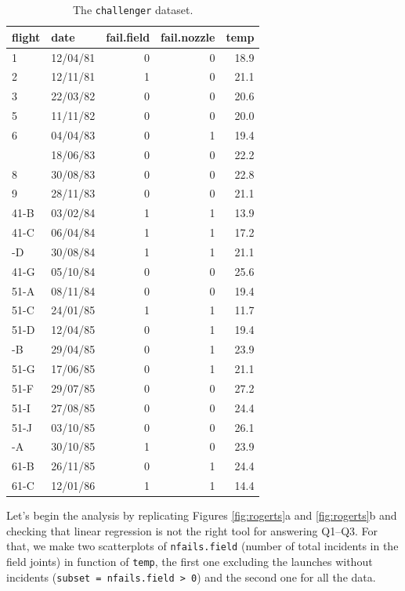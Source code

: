 \documentclass[]{book}
\theoremstyle{definition}
\theoremstyle{definition}
\theoremstyle{definition}
\theoremstyle{remark}
\begin{document}
\begin{longtable}[t]{llrrr}
\caption{\label{tab:unnamed-chunk-58}The \texttt{challenger} dataset.}\\
\toprule
flight & date & fail.field & fail.nozzle & temp\\
\midrule
1 & 12/04/81 & 0 & 0 & 18.9\\
2 & 12/11/81 & 1 & 0 & 21.1\\
3 & 22/03/82 & 0 & 0 & 20.6\\
5 & 11/11/82 & 0 & 0 & 20.0\\
6 & 04/04/83 & 0 & 1 & 19.4\\
\addlinespace
7 & 18/06/83 & 0 & 0 & 22.2\\
8 & 30/08/83 & 0 & 0 & 22.8\\
9 & 28/11/83 & 0 & 0 & 21.1\\
41-B & 03/02/84 & 1 & 1 & 13.9\\
41-C & 06/04/84 & 1 & 1 & 17.2\\
\addlinespace
41-D & 30/08/84 & 1 & 1 & 21.1\\
41-G & 05/10/84 & 0 & 0 & 25.6\\
51-A & 08/11/84 & 0 & 0 & 19.4\\
51-C & 24/01/85 & 1 & 1 & 11.7\\
51-D & 12/04/85 & 0 & 1 & 19.4\\
\addlinespace
51-B & 29/04/85 & 0 & 1 & 23.9\\
51-G & 17/06/85 & 0 & 1 & 21.1\\
51-F & 29/07/85 & 0 & 0 & 27.2\\
51-I & 27/08/85 & 0 & 0 & 24.4\\
51-J & 03/10/85 & 0 & 0 & 26.1\\
\addlinespace
61-A & 30/10/85 & 1 & 0 & 23.9\\
61-B & 26/11/85 & 0 & 1 & 24.4\\
61-C & 12/01/86 & 1 & 1 & 14.4\\
\bottomrule
\end{longtable}

Let's begin the analysis by replicating Figures \ref{fig:rogerts}a and
\ref{fig:rogerts}b and checking that linear regression is not the right
tool for answering Q1--Q3. For that, we make two scatterplots of
\texttt{nfails.field} (number of total incidents in the field joints) in
function of \texttt{temp}, the first one excluding the launches without
incidents (\texttt{subset\ =\ nfails.field\ \textgreater{}\ 0}) and the
second one for all the data.
\end{document}
